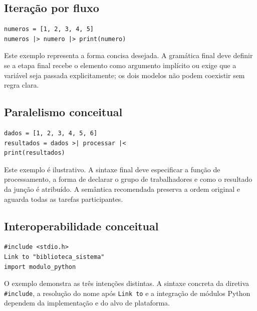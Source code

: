 \documentclass[12pt,a4paper]{article}
\begin{document}
\subsection{Iteração por fluxo}
\begin{lstlisting}
numeros = [1, 2, 3, 4, 5]
numeros |> numero |> print(numero)
\end{lstlisting}
Este exemplo representa a forma concisa desejada. A gramática final deve definir se a etapa final recebe o elemento como argumento implícito ou exige que a variável seja passada explicitamente; os dois modelos não podem coexistir sem regra clara.
\subsection{Paralelismo conceitual}
\begin{lstlisting}
dados = [1, 2, 3, 4, 5, 6]
resultados = dados >| processar |<
print(resultados)
\end{lstlisting}
Este exemplo é ilustrativo. A sintaxe final deve especificar a função de processamento, a forma de declarar o grupo de trabalhadores e como o resultado da junção é atribuído. A semântica recomendada preserva a ordem original e aguarda todas as tarefas participantes.
\subsection{Interoperabilidade conceitual}
\begin{lstlisting}
#include <stdio.h>
Link to "biblioteca_sistema"
import modulo_python
\end{lstlisting}
O exemplo demonstra as três intenções distintas. A sintaxe concreta da diretiva \texttt{\#include}, a resolução do nome após \texttt{Link to} e a integração de módulos Python dependem da implementação e do alvo de plataforma.
\end{document}
